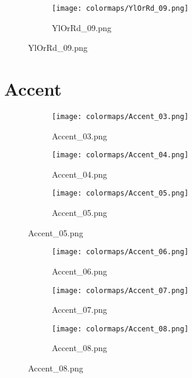 \documentclass{article}%
\begin{document}
%
\hspace{1cm}\hfill%


\begin{figure}[h!]%
\begin{subfigure}[b]{0.3\linewidth}%
\texttt{[image: colormaps/YlOrRd\_09.png]}%
\caption{YlOrRd\_09.png}%
\end{subfigure}%
\end{figure}

%
\newpage%
\section{Accent}%
\label{sec:Accent}%
\hspace{1cm}\hfill%
\hspace{1cm}\hfill%
\hspace{1cm}\hfill%


\begin{figure}[h!]%
\begin{subfigure}[b]{0.3\linewidth}%
\texttt{[image: colormaps/Accent\_03.png]}%
\caption{Accent\_03.png}%
\end{subfigure}%
\begin{subfigure}[b]{0.3\linewidth}%
\texttt{[image: colormaps/Accent\_04.png]}%
\caption{Accent\_04.png}%
\end{subfigure}%
\begin{subfigure}[b]{0.3\linewidth}%
\texttt{[image: colormaps/Accent\_05.png]}%
\caption{Accent\_05.png}%
\end{subfigure}%
\end{figure}

%
\hspace{1cm}\hfill%
\hspace{1cm}\hfill%
\hspace{1cm}\hfill%


\begin{figure}[h!]%
\begin{subfigure}[b]{0.3\linewidth}%
\texttt{[image: colormaps/Accent\_06.png]}%
\caption{Accent\_06.png}%
\end{subfigure}%
\begin{subfigure}[b]{0.3\linewidth}%
\texttt{[image: colormaps/Accent\_07.png]}%
\caption{Accent\_07.png}%
\end{subfigure}%
\begin{subfigure}[b]{0.3\linewidth}%
\texttt{[image: colormaps/Accent\_08.png]}%
\caption{Accent\_08.png}%
\end{subfigure}%
\end{figure}
\end{document}
